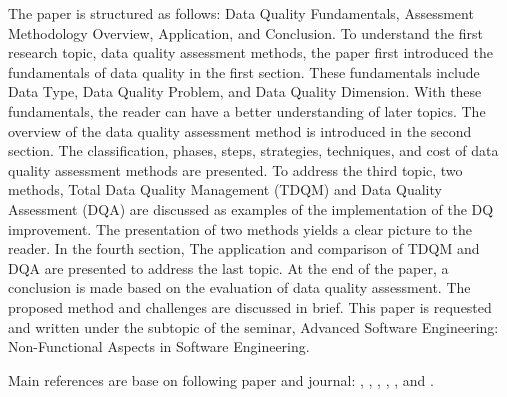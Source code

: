 \documentclass[pdftex,english,oribibl]{llncs}
\begin{document}
\begin{comment}
Researchers from academic and industry sectors are eager to explore more opportunities by employing these techniques. However, another issue quickly arises: How to one acquire high-quality data? Or, more precisely, how to defines the quality of a set of data? There is a famous saying in the field Machine Learning: "Garbage input equals garbage output!". That is, only with a systematic method to assess data set, are ML applications feasible for different domains. Traditionally, data labeling and assessment are done in either primitive or laborious manner, which becomes almost impossible in the big data era. The goal of this paper is to give an overview of methods to assess data quality and review the most popular data properties that can be analyzed. Moreover, this paper reviews several proposed data quality improvement methods after data quality are assessed. The application of the assessment methods is also presented.
\end{comment}


The paper is structured as follows: Data Quality Fundamentals, Assessment Methodology Overview, Application, and Conclusion.
To understand the first research topic, data quality assessment methods, the paper first introduced the fundamentals of data quality in the first section. These fundamentals include Data Type, Data Quality Problem, and Data Quality Dimension. With these fundamentals, the reader can have a better understanding of later topics. The overview of the data quality assessment method is introduced in the second section. The classification, phases, steps, strategies, techniques, and cost of data quality assessment methods are presented. To address the third topic,
two methods, Total Data Quality Management (TDQM) and Data Quality Assessment (DQA) are discussed as examples of the implementation of the DQ improvement. The presentation of two methods yields a clear picture to the reader. In the fourth section,  The application and comparison of TDQM and DQA are presented to address the last topic.
At the end of the paper, a conclusion is made based on the evaluation of data quality assessment. The proposed method and challenges are discussed in brief. This paper is requested and written under the subtopic of the seminar, Advanced Software Engineering: Non-Functional Aspects in Software Engineering.

Main references are base on following paper and journal: \citet{Cai2005ChallnegesOfDataQuality}, \citet{Pipino2002DataQualityAssessment}, \citet{Batini2009MethodologiesForDataQuality}, \citet{Wang1996BeyondAccuracy},  \citet{Borek2011AClassficationOfDataQualityAssessmentMethod}, and
   \citet{Cappiello2004DataQualityAssessmentfromTheUse}.
\end{document}

